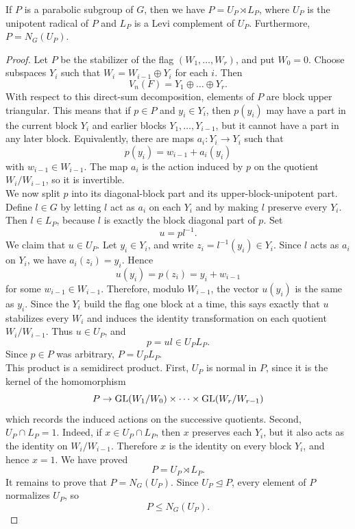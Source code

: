 \documentclass[../Odyssey_Project.tex]{subfiles}
\begin{document}
\begin{proposition}
\label{prop:5.2}
If $P$ is a parabolic subgroup of $G$, then we have $P = U_P \rtimes L_P$, where $U_P$ is the unipotent radical of $P$ and $L_P$ is a Levi complement of $U_P$. Furthermore, $P = N_G(U_P)$.
\end{proposition}
\begin{proof}
Let $P$ be the stabilizer of the flag $(W_1,\dots,W_r)$, and put $W_0=0$. Choose subspaces $Y_i$ such that $W_i=W_{i-1}\oplus Y_i$ for each $i$. Then
\[
    V_n(F)=Y_1\oplus \dots \oplus Y_r.
\]
With respect to this direct-sum decomposition, elements of $P$ are block upper triangular. This means that if $p\in P$ and $y_i\in Y_i$, then $p(y_i)$ may have a part in the current block $Y_i$ and earlier blocks $Y_1,\dots,Y_{i-1}$, but it cannot have a part in any later block. Equivalently, there are maps $a_i \colon Y_i\to Y_i$ such that
\[
    p(y_i)=w_{i-1}+a_i(y_i)
\]
with $w_{i-1}\in W_{i-1}$. The map $a_i$ is the action induced by $p$ on the quotient $W_i/W_{i-1}$, so it is invertible.\\
We now split $p$ into its diagonal-block part and its upper-block-unipotent part. Define $l\in G$ by letting $l$ act as $a_i$ on each $Y_i$ and by making $l$ preserve every $Y_i$. Then $l\in L_P$, because $l$ is exactly the block diagonal part of $p$. Set
\[
    u=pl^{-1}.
\]
We claim that $u\in U_P$. Let $y_i\in Y_i$, and write $z_i=l^{-1}(y_i)\in Y_i$. Since $l$ acts as $a_i$ on $Y_i$, we have $a_i(z_i)=y_i$. Hence
\[
    u(y_i)=p(z_i)=y_i+w_{i-1}
\]
for some $w_{i-1}\in W_{i-1}$. Therefore, modulo $W_{i-1}$, the vector $u(y_i)$ is the same as $y_i$. Since the $Y_i$ build the flag one block at a time, this says exactly that $u$ stabilizes every $W_i$ and induces the identity transformation on each quotient $W_i/W_{i-1}$. Thus $u\in U_P$, and
\[
    p=ul\in U_PL_P.
\]
Since $p\in P$ was arbitrary, $P=U_PL_P$.\\
This product is a semidirect product. First, $U_P$ is normal in $P$, since it is the kernel of the homomorphism
\[
    P\to \operatorname{GL}(W_1/W_0)\times \dots \times \operatorname{GL}(W_r/W_{r-1})
\]
which records the induced actions on the successive quotients. Second, $U_P\cap L_P=1$. Indeed, if $x\in U_P\cap L_P$, then $x$ preserves each $Y_i$, but it also acts as the identity on $W_i/W_{i-1}$. Therefore $x$ is the identity on every block $Y_i$, and hence $x=1$. We have proved
\[
    P=U_P\rtimes L_P.
\]
It remains to prove that $P=N_G(U_P)$. Since $U_P\trianglelefteq P$, every element of $P$ normalizes $U_P$, so
\[
    P\leq N_G(U_P).
\]
\end{proof}
\end{document}
